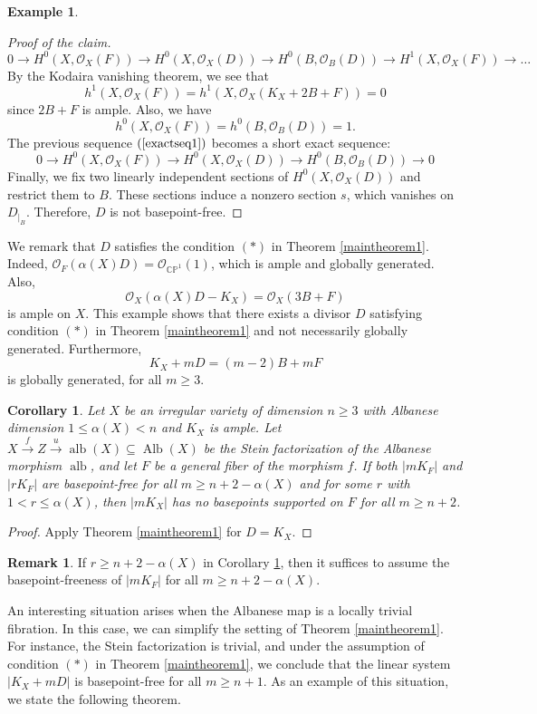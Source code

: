 \documentclass[sn-mathphys-num]{sn-jnl}%
\newtheorem{corollary}[theorem]{Corollary}
\theoremstyle{definition}
\newtheorem{remark}[theorem]{Remark}
\newtheorem{example}[theorem]{Example}
\numberwithin{equation}{section}
\begin{document}
\begin{example}
\begin{proof}[Proof of the claim]
\begin{equation}
0 \to H^{0}(X, \mathcal{O}_{X}(F)) \to H^{0}(X, \mathcal{O}_{X}(D)) \to H^{0}(B, \mathcal{O}_{B}(D)) \to H^{1}(X, \mathcal{O}_{X}(F)) \to \dots
\end{equation}
By the Kodaira vanishing theorem, we see  that $$h^{1}(X, \mathcal{O}_{X}(F)) = h^{1}(X, \mathcal{O}_{X}(K_{X} + 2B + F)) = 0$$ since $2B + F$ is ample. Also, we have $$h^{0}(X, \mathcal{O}_{X}(F)) = h^{0}(B, \mathcal{O}_{B}(D)) = 1.$$ The previous sequence $(\ref{exactseq1})$ becomes a short exact sequence:
\[
0 \to H^{0}(X, \mathcal{O}_{X}(F)) \to H^{0}(X, \mathcal{O}_{X}(D)) \to H^{0}(B, \mathcal{O}_{B}(D)) \to 0
\]
Finally, we fix two linearly independent sections of \( H^{0}(X, \mathcal{O}_{X}(D)) \) and restrict them to \( B \). These sections induce a nonzero section \( s \), which vanishes on $D_{|_{B}}$. Therefore, $D$ is not basepoint-free.
\end{proof}
We remark that $D$ satisfies the condition $(*)$ in Theorem \ref{maintheorem1}. Indeed, $\mathcal{O}_{F}(\alpha(X)D) = \mathcal{O}_{\mathbb{CP}^{1}}(1)$, which is ample and globally generated. Also, $$\mathcal{O}_{X}(\alpha(X)D - K_{X}) = \mathcal{O}_{X}(3B + F)$$ is ample on $X$. This example shows that there exists a divisor $D$ satisfying condition $(*)$ in Theorem \ref{maintheorem1} and not necessarily globally generated. Furthermore, $$K_{X} + mD = (m-2)B + mF$$  is globally generated, for all $m \geq 3$. 
\end{example}
\begin{corollary}\label{mainresult2}
Let $X$ be an irregular variety of dimension $n\geq 3$ with Albanese dimension $1 \leq \alpha(X) < n$ and $K_{X}$ is ample. Let $X \xrightarrow{f} Z \xrightarrow{u} \operatorname{alb}(X) \subseteq \operatorname{Alb}(X)$ be the Stein factorization of the Albanese morphism $\operatorname{alb}$, and let $F$ be a general fiber of the morphism $f$. If both $|mK_{F}|$ and $|rK_{F}|$ are basepoint-free for all $m \geq n + 2 -\alpha(X)$ and for some $r$ with $1 < r \leq \alpha(X)$, then $|mK_{X}|$ has no  basepoints supported on $F$ for all $m \geq n+2$.  
\end{corollary}
\begin{proof}
Apply  Theorem \ref{maintheorem1} for $D = K_{X}$.
\end{proof}
\begin{remark}
    If $r \geq n+2-\alpha(X)$ in Corollary \ref{mainresult2}, then it suffices to assume the basepoint-freeness of $|mK_{F}|$ for all $m \geq n + 2 - \alpha(X)$.
\end{remark}
\par An interesting situation arises when the Albanese map is a  locally trivial fibration. In this case, we can simplify the setting of Theorem \ref{maintheorem1}. For instance, the Stein factorization is trivial, and  under the assumption of condition $(*)$ in Theorem \ref{maintheorem1}, we conclude that the linear system  $|K_{X} + mD|$ is basepoint-free for all $m \geq n+1$. As an example of this  situation, we state the following theorem.
\end{document}
